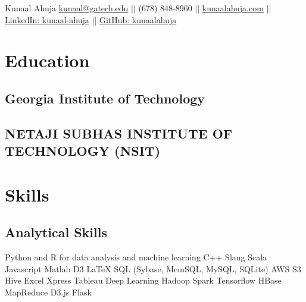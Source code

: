 \documentclass[]{resume-openfont}
\begin{document}
%
%
\namesection{}
{Kunaal Ahuja}{
\href{mailto:kunaal@gatech.edu}{kunaal@gatech.edu} || 
(678) 848-8960 ||
\href{http://www.kunaalahuja.com/}{kunaalahuja.com} ||
\href{https://www.linkedin.com/in/kunaal-ahuja/}{LinkedIn: kunaal-ahuja} ||  
\href{https://github.com/kunaalahuja/}{GitHub: kunaalahuja} \\
}
%
%

\begin{minipage}[t]{0.33\textwidth} 


\section{Education} 

\subsection{Georgia Institute of Technology}
\sectionsep

\subsection{NETAJI SUBHAS INSTITUTE OF TECHNOLOGY (NSIT)}
\sectionsep


\section{Skills}
\subsection{Analytical Skills}
Python and R for data analysis and machine learning \textbullet{}   C++ \textbullet{} Slang \textbullet{} Scala \\
Javascript \textbullet{} Matlab \textbullet{} D3 \textbullet{} \LaTeX  
\vspace{6pt}
SQL (Sybase, MemSQL, MySQL, SQLite) \textbullet{} AWS S3 \textbullet{} Hive \textbullet{} Excel \textbullet{} Xpress \textbullet{} Tableau\vspace{6pt}
Deep Learning   \textbullet{} Hadoop \textbullet{} Spark \textbullet{} Tensorflow \textbullet{} HBase \textbullet{} MapReduce \textbullet{} D3.js 
\textbullet{} Flask
\sectionsep


\end{minipage}
\end{document}
